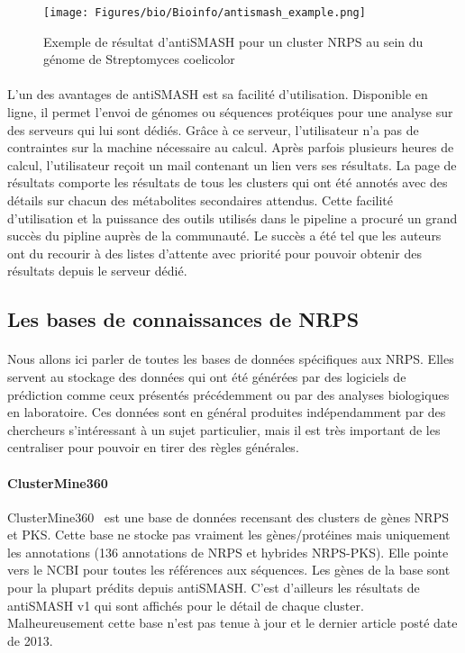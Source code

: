 \documentclass[12pt,french,twoside]{report}
\begin{document}
\begin{figure}
  \begin{center}
    \texttt{[image: Figures/bio/Bioinfo/antismash\_example.png]}
    \caption{\label{antismash_result}Exemple de résultat d'antiSMASH pour un cluster NRPS au sein du génome de Streptomyces coelicolor}
  \end{center}
\end{figure}

\paragraph{}L'un des avantages de antiSMASH est sa facilité d'utilisation.
Disponible en ligne, il permet l'envoi de génomes ou séquences protéiques pour une analyse sur des serveurs qui lui sont dédiés.
Grâce à ce serveur, l'utilisateur n'a pas de contraintes sur la machine nécessaire au calcul.
Après parfois plusieurs heures de calcul, l'utilisateur reçoit un mail contenant un lien vers ses résultats.
La page de résultats comporte les résultats de tous les clusters qui ont été annotés avec des détails sur chacun des métabolites secondaires attendus.
Cette facilité d'utilisation et la puissance des outils utilisés dans le pipeline a procuré un grand succès du pipline auprès de la communauté.
Le succès a été tel que les auteurs ont du recourir à des listes d'attente avec priorité pour pouvoir obtenir des résultats depuis le serveur dédié.



\subsection{Les bases de connaissances de NRPS}

\paragraph{}Nous allons ici parler de toutes les bases de données spécifiques aux NRPS.
Elles servent au stockage des données qui ont été générées par des logiciels de prédiction comme ceux présentés précédemment ou par des analyses biologiques en laboratoire.
Ces données sont en général produites indépendamment par des chercheurs s'intéressant à un sujet particulier, mais il est très important de les centraliser pour pouvoir en tirer des règles générales.

\paragraph{ClusterMine360}
ClusterMine360~\cite{conway_clustermine360:_2013} est une base de données recensant des clusters de gènes NRPS et PKS.
Cette base ne stocke pas vraiment les gènes/protéines mais uniquement les annotations (136 annotations de NRPS et hybrides NRPS-PKS).
Elle pointe vers le NCBI pour toutes les références aux séquences.
Les gènes de la base sont pour la plupart prédits depuis antiSMASH.
C'est d'ailleurs les résultats de antiSMASH v1 qui sont affichés pour le détail de chaque cluster.
Malheureusement cette base n'est pas tenue à jour et le dernier article posté date de 2013.
\end{document}
